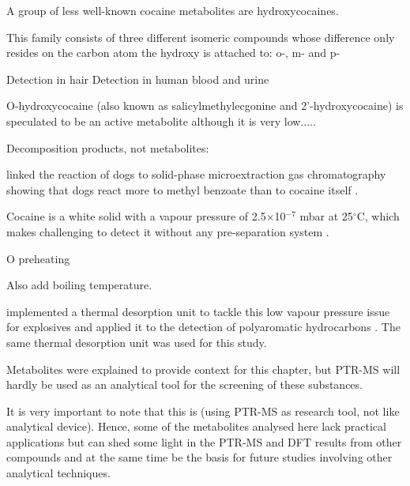 
A group of less well-known cocaine metabolites are hydroxycocaines.

This family consists of three different isomeric compounds whose difference only resides on the carbon atom the hydroxy is attached to: o-, m- and p- 

Detection in hair \cite{schaffer2016analysis}
Detection in human blood and urine \cite{paul2005concentration}


O-hydroxycocaine (also known as salicylmethylecgonine and 2'-hydroxycocaine) is speculated to be an active metabolite although it is very low.....






Decomposition products, not metabolites:

\citeauthor{furton2002identification} linked the reaction of dogs to solid-phase microextraction gas chromatography  showing that dogs react more to methyl benzoate  than to cocaine itself \cite{furton2002identification}.





Cocaine is a white solid with a vapour pressure of 2.5$\times$10$^{-7}$ mbar  at 25$^\circ$C, which makes challenging to detect it without any pre-separation system \cite{cocaineVP55}.

O preheating

Also add boiling temperature.

\citeauthor{RN445} implemented a thermal desorption unit to tackle this low vapour pressure issue for explosives and \citeauthor{blenkhorn2019novel} applied it to the detection of polyaromatic hydrocarbons \cite{RN445,blenkhorn2019novel}.
The same thermal desorption unit was used for this study.


Metabolites were explained to provide  context for this chapter, but PTR-MS will hardly be used as an analytical tool for the screening of these substances.

It is very important to note that this is (using PTR-MS as research tool, not like analytical device).
Hence, some of the metabolites analysed here lack practical applications but can shed some light in the PTR-MS and DFT results from other compounds and at the same time be the basis for future studies involving other analytical techniques.







